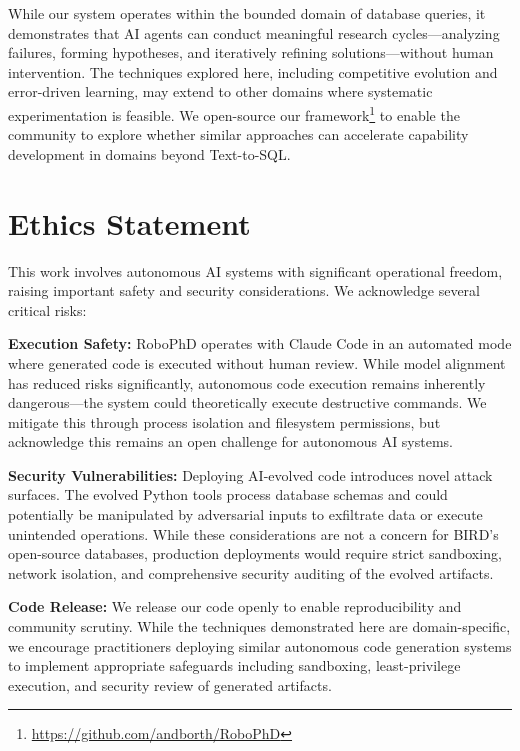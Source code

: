 \documentclass{article}
\begin{document}
While our system operates within the bounded domain of database queries, it demonstrates that AI agents can conduct meaningful research cycles—analyzing failures, forming hypotheses, and iteratively refining solutions—without human intervention. The techniques explored here, including competitive evolution and error-driven learning, may extend to other domains where systematic experimentation is feasible.
We open-source our framework\footnote{\url{https://github.com/andborth/RoboPhD}} to enable the community to explore whether similar approaches can accelerate capability development in domains beyond Text-to-SQL.

\section*{Ethics Statement}

This work involves autonomous AI systems with significant operational freedom, raising important safety and security considerations. We acknowledge several critical risks:

\textbf{Execution Safety:} RoboPhD operates with Claude Code in an automated mode where generated code is executed without human review. While model alignment has reduced risks significantly, autonomous code execution remains inherently dangerous—the system could theoretically execute destructive commands. We mitigate this through process isolation and filesystem permissions, but acknowledge this remains an open challenge for autonomous AI systems.

\textbf{Security Vulnerabilities:} Deploying AI-evolved code introduces novel attack surfaces. The evolved Python tools process database schemas and could potentially be manipulated by adversarial inputs to exfiltrate data or execute unintended operations. While these considerations are not a concern for BIRD's open-source databases, production deployments would require strict sandboxing, network isolation, and comprehensive security auditing of the evolved artifacts.

\textbf{Code Release:} We release our code openly to enable reproducibility and community scrutiny. While the techniques demonstrated here are domain-specific, we encourage practitioners deploying similar autonomous code generation systems to implement appropriate safeguards including sandboxing, least-privilege execution, and security review of generated artifacts.




\end{document}
